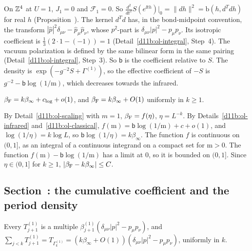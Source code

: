 \begin{step}
On $\mathbb Z^4$ at $U=1$, $J_1=0$ and $\mathcal F_1=0$. So $\frac{d^2}{dt^2}S(e^{\ii th})|_0=\|dh\|^2=\mathrm b(h,d^Tdh)$ for real $h$ (Proposition~). The kernel $d^Td$ has, in the bond-midpoint convention, the transform $|\hat p|^2\delta_{\mu\nu}-\hat p_\mu\hat p_\nu$, whose $p^2$-part is $\delta_{\mu\nu}|p|^2-p_\mu p_\nu$. Its isotropic coefficient is $\frac13(2\cdot1-(-1))=1$ (Detail~\ref{d11b:ol-integral}, Step~4). The vacuum polarization is defined by the same bilinear form in the same pairing (Detail~\ref{d11b:ol-integral}, Step~3). So $\mathsf b$ is the coefficient relative to $S$. The density is $\exp(-g^{-2}S+\Gamma^{(1)})$, so the effective coefficient of $-S$ is $g^{-2}-\mathsf b\log(1/\mathrm m)$, which decreases towards the infrared.
\end{step}

\begin{detail}\label{d11b:ol-log}
$\beta_{\rm F}=k\beta_\infty+c_{\log}+o(1)$, and $\beta_{\rm F}=k\beta_\infty+O(1)$ uniformly in $k\ge1$.
\end{detail}

\begin{step}[Proof]
By Detail~\ref{d11b:ol-scaling} with $m=1$, $\beta_{\rm F}=f(\eta)$, $\eta=L^{-k}$. By Details~\ref{d11b:ol-infrared} and~\ref{d11b:ol-classical}, $f(\mathrm m)=\mathsf b\log(1/\mathrm m)+c+o(1)$, and $\log(1/\eta)=k\log L$, so $\mathsf b\log(1/\eta)=k\beta_\infty$. The function $f$ is continuous on $(0,1]$, as an integral of a continuous integrand on a compact set for $\mathrm m>0$. The function $f(\mathrm m)-\mathsf b\log(1/\mathrm m)$ has a limit at $0$, so it is bounded on $(0,1]$. Since $\eta\in(0,1]$ for $k\ge1$, $|\beta_{\rm F}-k\beta_\infty|\le C$.
\end{step}

\subsection{Section~\texorpdfstring{}{58}: the cumulative coefficient and the period density}\label{d11b:58a}

\begin{detail}\label{d11b:ol-cumulative}
Every $T^{(1)}_{j+1}$ is a multiple $\beta^{(1)}_{j+1}(\delta_{\mu\nu}|p|^2-p_\mu p_\nu)$, and $\sum_{j<k}T^{(1)}_{j+1}=T_{\Gamma^{(1)}_k}=(k\beta_\infty+O(1))(\delta_{\mu\nu}|p|^2-p_\mu p_\nu)$, uniformly in $k$.
\end{detail}

